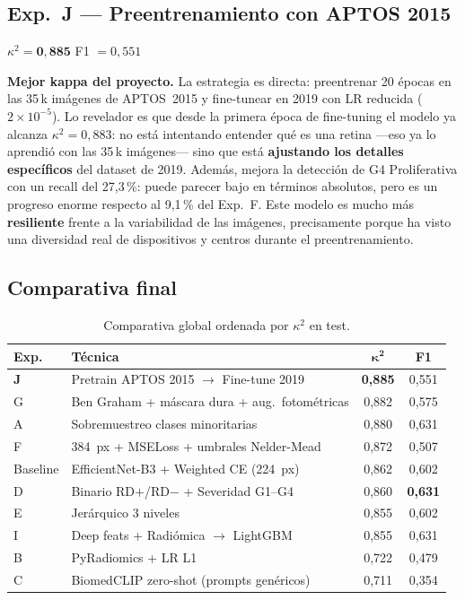 \documentclass[12pt, a4paper]{article}
\begin{document}
\subsection{Exp.~J --- Preentrenamiento con APTOS 2015}

$\kappa^2 = \mathbf{0{,}885}$ \quad F1 $= 0{,}551$

\textbf{Mejor kappa del proyecto.} La estrategia es directa: preentrenar
20 épocas en las 35\,k imágenes de APTOS~2015 y fine-tunear en 2019 con
LR reducida ($2{\times}10^{-5}$). Lo revelador es que desde la primera
época de fine-tuning el modelo ya alcanza $\kappa^2 = 0{,}883$: no está
intentando entender qué es una retina ---eso ya lo aprendió con las 35\,k
imágenes--- sino que está \textbf{ajustando los detalles específicos} del
dataset de 2019. Además, mejora la detección de G4 Proliferativa con un
recall del 27,3\,\%: puede parecer bajo en términos absolutos, pero es un
progreso enorme respecto al 9,1\,\% del Exp.~F. Este modelo es mucho más
\textbf{resiliente} frente a la variabilidad de las imágenes, precisamente
porque ha visto una diversidad real de dispositivos y centros durante el
preentrenamiento.

\subsection{Comparativa final}

\begin{table}[H]
\centering
\small
\caption{Comparativa global ordenada por $\kappa^2$ en test.}
\label{tab:comparativa}
\begin{tabularx}{\textwidth}{l X c c}
\toprule
\rowcolor{azuloscuro!15}
\textbf{Exp.} & \textbf{Técnica} & $\boldsymbol{\kappa^2}$ & \textbf{F1} \\
\midrule
\textbf{J} & Pretrain APTOS 2015 $\to$ Fine-tune 2019
           & \textbf{0,885} & 0,551 \\
\rowcolor{grisclaro}
G & Ben Graham + máscara dura + aug.\ fotométricas
  & 0,882 & 0,575 \\
A & Sobremuestreo clases minoritarias
  & 0,880 & 0,631 \\
\rowcolor{grisclaro}
F & 384~px + MSELoss + umbrales Nelder-Mead
  & 0,872 & 0,507 \\
Baseline & EfficientNet-B3 + Weighted CE (224~px)
         & 0,862 & 0,602 \\
\rowcolor{grisclaro}
D & Binario RD$+$/RD$-$ + Severidad G1--G4
  & 0,860 & \textbf{0,631} \\
E & Jerárquico 3 niveles
  & 0,855 & 0,602 \\
\rowcolor{grisclaro}
I & Deep feats + Radiómica $\to$ LightGBM
  & 0,855 & 0,631 \\
B & PyRadiomics + LR L1
  & 0,722 & 0,479 \\
\rowcolor{grisclaro}
C & BiomedCLIP zero-shot (prompts genéricos)
  & 0,711 & 0,354 \\
\bottomrule
\end{tabularx}
\end{table}
\end{document}
